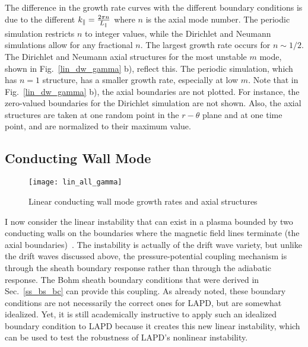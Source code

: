 The difference in the growth rate curves with the different boundary conditions is due to the different $k_\parallel = \frac{2 \pi n}{L_\parallel}$ where $n$ is the axial mode number. The periodic simulation
restricts $n$ to integer values, while the Dirichlet and Neumann simulations allow for any fractional $n$. The largest growth rate occurs for $n \sim 1/2$. The Dirichlet and Neumann axial structures
for the most unstable $m$ mode, shown in Fig.~\ref{lin_dw_gamma} b), reflect this. The periodic simulation, which has $n=1$ structure, has a smaller growth rate, especially at low $m$. Note that in
Fig.~\ref{lin_dw_gamma} b), the axial boundaries are not plotted. For instance, the zero-valued boundaries for the Dirichlet simulation are not shown. Also, the axial structures are taken at one
random point in the $r-\theta$ plane and at one time point, and are normalized to their maximum value.

\subsection{Conducting Wall Mode}
\label{ss_cwm}

\begin{figure}[!ht]
\centerline{\texttt{[image: lin\_all\_gamma]}}
\caption{Linear conducting wall mode growth rates and axial structures}
\label{lin_all_gamma}
\end{figure}


I now consider the linear instability that can exist in a plasma bounded by two conducting walls on the boundaries where the magnetic field lines terminate
(the axial boundaries)~\cite{berk1991,berk1993,xu1993}.
The instability is actually of the drift wave variety, but unlike the drift waves discussed above, the pressure-potential coupling mechanism is through the sheath boundary response
rather than through the adiabatic response. The Bohm sheath boundary conditions that were derived in Sec.~\ref{ss_bs_bc} can provide this coupling. 
As already noted, these boundary conditions are not necessarily the correct ones
for LAPD, but are somewhat idealized. Yet, it is still academically instructive to apply such an idealized boundary condition to LAPD because it creates this new linear instability, which
can be used to test the robustness of LAPD's nonlinear instability.

